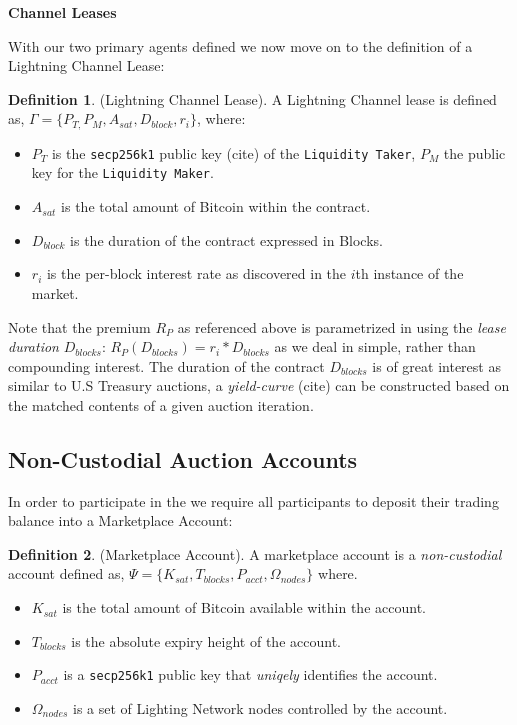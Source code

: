 \documentclass[12pt,a4paper]{article}
\theoremstyle{definition}
\newtheorem{definition}{Definition}[section]
\begin{document}
\begin{center}
\textbf{Channel Leases}
\end{center}

With our two primary agents defined we now move on to the definition of a
Lightning Channel Lease:

\begin{definition}{(Lightning Channel Lease).}
    A Lightning Channel lease is defined as, $\Gamma = \{P_{T,} P_{M}, A_{sat},
    D_{block}, r_{i} \}$, where:
\end{definition}

\begin{itemize}
    \item $P_{T}$ is the \texttt{secp256k1} public key (cite) of the
\texttt{Liquidity Taker}, $P_{M}$ the public key for the \texttt{Liquidity
Maker}.
    \item $A_{sat}$ is the total amount of Bitcoin within the contract.
    \item $D_{block}$ is the duration of the contract expressed in Blocks.
    \item $r_{i}$ is the per-block interest rate as discovered in the $i$th
    instance of the market.
\end{itemize}

Note that the premium $R_{P}$ as referenced above is parametrized in using the
\emph{lease duration} $D_{blocks}$: $R_{P}(D_{blocks}) = r_i * D_{blocks}$ as
we deal in simple, rather than compounding interest.  The duration of the
contract $D_{blocks}$ is of great interest as similar to U.S Treasury auctions,
a \emph{yield-curve} (cite) can be constructed based on the matched contents of
a given auction iteration. %


\subsection{Non-Custodial Auction Accounts}

In order to participate in the we require all participants to deposit their
trading balance into a Marketplace Account:

\theoremstyle{definition}
\begin{definition}{(Marketplace Account).}
A marketplace account is a \emph{non-custodial} account defined as, $\Psi =
\{K_{sat}, T_{blocks}, P_{acct}, \Omega_{nodes} \}$ where.
\end{definition}

\begin{itemize}
    \item $K_{sat}$ is the total amount of Bitcoin available within the account.
    \item $T_{blocks}$ is the absolute expiry height of the account.
    \item $P_{acct}$ is a \texttt{secp256k1} public key  that \emph{uniqely} identifies the account.
    \item $\Omega_{nodes}$ is a set of Lighting Network nodes controlled by the account.
\end{itemize}
\end{document}
